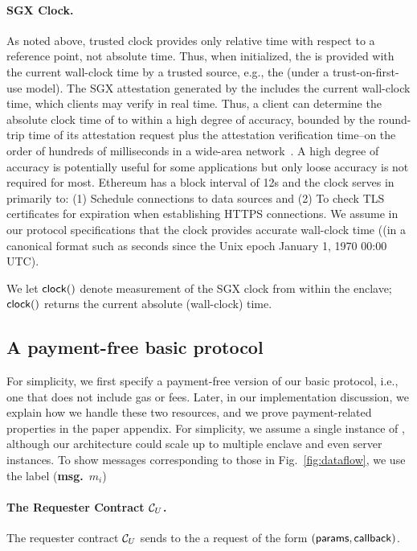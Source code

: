 \paragraph{\bf SGX Clock.}
As noted above, trusted clock provides only relative time with respect to a reference point, not absolute time. Thus, when initialized, the \encname is provided with the current wall-clock time by a trusted source, e.g., the \medname (under a trust-on-first-use model). The SGX attestation generated by the \encname includes the current wall-clock time, which clients may verify in real time. Thus, a client can determine the absolute clock time of \encname to within a high degree of accuracy, bounded by the round-trip time of its attestation request plus the attestation verification time--on the order of hundreds of milliseconds in a wide-area network~\cite{}. A high degree of accuracy is potentially useful for some applications but only loose accuracy is not required for most. Ethereum has a block interval of 12s and the clock serves in \tc primarily to: (1) Schedule connections to data sources and (2) To check TLS certificates for expiration when establishing HTTPS connections. We assume in our protocol specifications that the \encname clock provides accurate wall-clock time ((in a canonical format such as seconds since the Unix epoch January 1, 1970 00:00 UTC).

We let ${{\sf clock}}()$ denote measurement of the SGX clock from within the enclave; ${{\sf clock}}()$ returns the current absolute (wall-clock) time. 


\subsection{A payment-free basic protocol}
For simplicity, we first specify a payment-free version of our basic protocol, i.e., one that does not include gas or fees. Later, in our implementation discussion, we explain how we handle these two resources, and we prove payment-related properties in the paper appendix. For simplicity, we assume a single instance of \engine, although our architecture could scale up to multiple enclave and even server instances. To show messages corresponding to those in Fig.~\ref{fig:dataflow}, we use the label ({\bf msg.}~$m_i$)

\paragraph{The Requester Contract ${\cal C}_U$.}
The requester contract ${\cal C}_U$ sends to the \tcontract \tcont
a request of the form $({\sf params}, {\sf callback})$.

